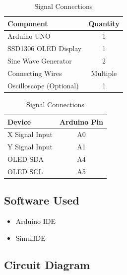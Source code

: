 \begin{table}[H]
\centering

\begin{minipage}[t]{0.48\textwidth}
\centering
\caption{Lissajous Pattern Generator Components}
\label{tab:lissajous_components}

\begin{tabular}{|p{4cm}|c|}
\hline
\textbf{Component} & \textbf{Quantity} \\
\hline
Arduino UNO & 1 \\
SSD1306 OLED Display & 1 \\
Sine Wave Generator & 2 \\
Connecting Wires & Multiple \\
Oscilloscope (Optional) & 1 \\
\hline
\end{tabular}

\end{minipage}
\hfill
\begin{minipage}[t]{0.47\textwidth}
\centering
\caption{Signal Connections}
\label{tab:lissajous_connections}

\begin{tabular}{|l|c|}
\hline
\textbf{Device} & \textbf{Arduino Pin} \\
\hline
X Signal Input & A0 \\
Y Signal Input & A1 \\
OLED SDA & A4 \\
OLED SCL & A5 \\
\hline
\end{tabular}

\end{minipage}

\end{table}


\subsection{Software Used}

\begin{itemize}
    \item Arduino IDE
    \item SimulIDE
\end{itemize}


\subsection{Circuit Diagram}

